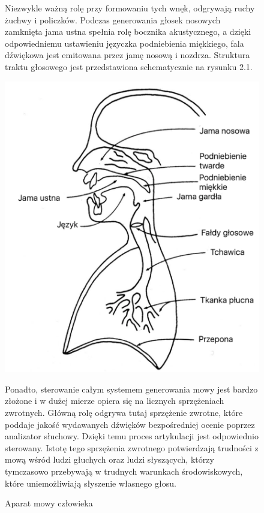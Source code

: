 \documentclass[eng,printmode]{mgr}
\begin{document}
\begin{figure}
	Niezwykle ważną rolę przy formowaniu tych wnęk, odgrywają ruchy żuchwy i policzków. Podczas generowania głosek nosowych zamknięta jama ustna spełnia rolę bocznika akustycznego, a dzięki odpowiedniemu ustawieniu języczka podniebienia miękkiego, fala dźwiękowa jest emitowana przez jamę nosową i nozdrza. Struktura traktu głosowego jest przedstawiona schematycznie na rysunku 2.1.
	\begin{center}
		\includegraphics[scale=0.25]{speechmechpl.png}
		\caption{Aparat mowy człowieka}\vspace{5mm}
	\end{center}

	 Ponadto, sterowanie całym systemem generowania mowy jest bardzo złożone i w dużej mierze opiera się na licznych sprzężeniach zwrotnych. Główną rolę odgrywa tutaj sprzężenie zwrotne, które poddaje jakość wydawanych dźwięków bezpośredniej ocenie poprzez analizator słuchowy. Dzięki temu proces artykulacji jest odpowiednio sterowany. Istotę tego sprzężenia zwrotnego potwierdzają trudności z mową wśród ludzi głuchych oraz ludzi słyszących, którzy tymczasowo przebywają w trudnych warunkach środowiskowych, które uniemożliwiają słyszenie własnego głosu.\vspace{5mm}
 

\end{figure}
\end{document}
